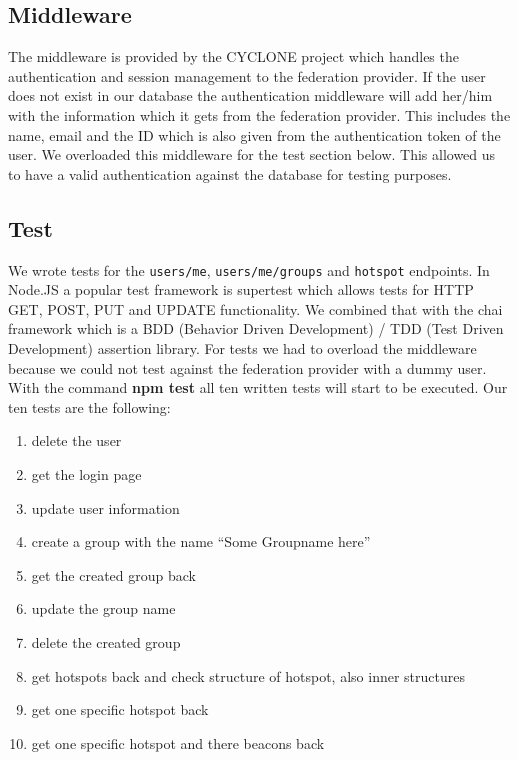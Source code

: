 
\subsection{Middleware}
\label{backend-middleware}

The middleware is provided by the CYCLONE project which handles the authentication and session management to the federation provider. If the user does not exist in our database the authentication middleware will add her/him with the information which it gets from the federation provider. This includes the name, email and the ID which is also given from the authentication token of the user. We overloaded this middleware for the test section below. This allowed us to have a valid authentication against the database for testing purposes.

\subsection{Test}

We wrote tests for the \texttt{users/me}, \texttt{users/me/groups} and \texttt{hotspot} endpoints. In Node.JS a popular test framework is supertest which allows tests for HTTP GET, POST, PUT and UPDATE functionality. We combined that with the chai framework which is a BDD (Behavior Driven Development) / TDD (Test Driven Development) assertion library. For tests we had to overload the middleware because we could not test against the federation provider with a dummy user. With the command \textbf{npm test} all ten written tests will start to be executed. Our ten tests are the following:

\begin{enumerate}
  \item delete the user
  \item get the login page
  \item update user information
  \item create a group with the name \enquote{Some Groupname here}
  \item get the created group back
  \item update the group name
  \item delete the created group
  \item get hotspots back and check structure of hotspot, also inner structures
  \item get one specific hotspot back
  \item get one specific hotspot and there beacons back
\end{enumerate}

